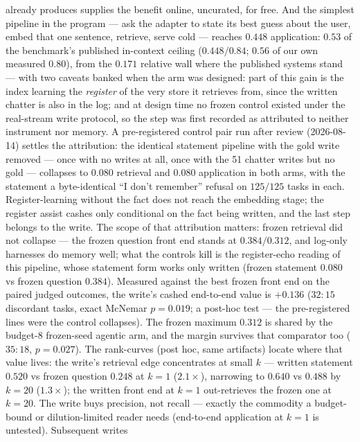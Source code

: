 \documentclass[11pt]{article}
\begin{document}
already produces supplies the benefit online, uncurated, for free. And the simplest
pipeline in the program --- ask
the adapter to state its best guess about the user, embed that one sentence, retrieve,
serve cold --- reaches $\mathbf{0.448}$ application: $0.53$ of the benchmark's published
in-context ceiling ($0.448/0.84$; $0.56$ of our own measured $0.80$), from the $0.171$
relative wall where the published systems stand --- with two caveats banked when the arm
was designed: part of this gain is the index learning the \emph{register} of the very
store it retrieves from, since the written chatter is also in the log; and at design time
no frozen control existed under the real-stream write protocol, so the step was first
recorded as attributed to neither instrument nor memory. A pre-registered control pair
run after review (2026-08-14) settles the attribution: the identical statement pipeline
with the gold write removed --- once with no writes at all, once with the 51 chatter
writes but no gold --- collapses to $0.080$ retrieval and $0.080$ application in both
arms, with the statement a byte-identical ``I don't remember'' refusal on $125/125$
tasks in each. Register-learning without the fact does not reach the embedding stage;
the register assist cashes only conditional on the fact being written, and the last step
belongs to the write. The scope of that attribution matters: frozen retrieval did not
collapse --- the frozen question front end stands at $0.384/0.312$, and log-only
harnesses do memory well; what the controls kill is the register-echo reading of this
pipeline, whose statement form works only written (frozen statement $0.080$ vs frozen
question $0.384$). Measured against the best frozen front end on the paired judged
outcomes, the write's cashed end-to-end value is $+0.136$ ($32{:}15$ discordant tasks,
exact McNemar $p{=}0.019$; a post-hoc test --- the pre-registered lines were the
control collapses). The frozen maximum $0.312$ is shared by the budget-8 frozen-seed
agentic arm, and the margin survives that comparator too ($35{:}18$, $p{=}0.027$).
The rank-curves (post hoc, same artifacts) locate where that value lives: the write's
retrieval edge concentrates at small $k$ --- written statement $0.520$ vs frozen
question $0.248$ at $k{=}1$ ($2.1\times$), narrowing to $0.640$ vs $0.488$ by $k{=}20$
($1.3\times$); the written front end at $k{=}1$ out-retrieves the frozen one at
$k{=}20$. The write buys precision, not recall --- exactly the commodity a
budget-bound or dilution-limited reader needs (end-to-end application at $k{=}1$ is
untested).
Subsequent writes
\end{document}
